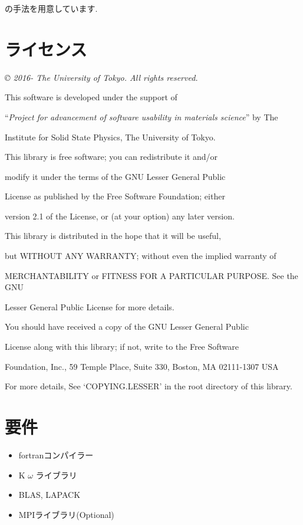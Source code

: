 \documentclass[letterpaper,10pt,dvipdfmx,openany]{sphinxmanual}
\begin{document}
の手法を用意しています.


\chapter{ライセンス}
\label{shiftk_copy_ja::doc}\label{shiftk_copy_ja:id1}
\emph{© 2016- The University of Tokyo. All rights reserved.}

\begin{DUlineblock}{0em}
\item[] This software is developed under the support of
\item[] ``\emph{Project for advancement of software usability in materials science}'' by The
\item[] Institute for Solid State Physics, The University of Tokyo.
\item[] 
\item[] This library is free software; you can redistribute it and/or
\item[] modify it under the terms of the GNU Lesser General Public
\item[] License as published by the Free Software Foundation; either
\item[] version 2.1 of the License, or (at your option) any later version.
\item[] This library is distributed in the hope that it will be useful,
\item[] but WITHOUT ANY WARRANTY; without even the implied warranty of
\item[] MERCHANTABILITY or FITNESS FOR A PARTICULAR PURPOSE. See the GNU
\item[] Lesser General Public License for more details.
\item[] 
\item[] You should have received a copy of the GNU Lesser General Public
\item[] License along with this library; if not, write to the Free Software
\item[] Foundation, Inc., 59 Temple Place, Suite 330, Boston, MA 02111-1307 USA
\item[] 
\item[] For more details, See ‘COPYING.LESSER’ in the root directory of this library.
\end{DUlineblock}


\chapter{要件}
\label{shiftk_env_ja::doc}\label{shiftk_env_ja:id1}\begin{itemize}
\item {} 
fortranコンパイラー

\item {} 
K \(\omega\) ライブラリ

\item {} 
BLAS, LAPACK

\item {} 
MPIライブラリ(Optional)

\end{itemize}
\end{document}
